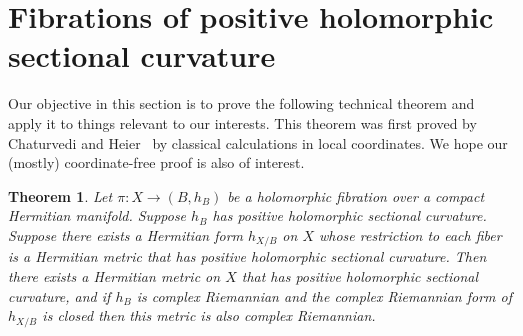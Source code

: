 \documentclass[10pt,a4paper]{amsart}
\newtheorem{theo}{Theorem}[section]
\theoremstyle{definition}
\def\kahler{complex Riemannian}
\begin{document}
\section{Fibrations of positive holomorphic sectional curvature}
\label{sec:grassmannian-bundles}

Our objective in this section is to prove the following technical theorem and apply it to things relevant to our interests.
This theorem was first proved by Chaturvedi and Heier~\cite[Theorem~1.1]{chaturvedi2020hermitian} by classical calculations in local coordinates.
We hope our (mostly) coordinate-free proof is also of interest.

\begin{theo}
\label{thm:holomorphic-sectional-positive}
Let $\pi : X \to (B,h_{B})$ be a holomorphic fibration over a compact Hermitian manifold.
Suppose $h_{B}$ has positive holomorphic sectional curvature.
Suppose there exists a Hermitian form $h_{X/B}$ on $X$ whose restriction to each fiber is a Hermitian metric that has positive holomorphic sectional curvature.
Then there exists a Hermitian metric on $X$ that has positive holomorphic sectional curvature, and if $h_{B}$ is \kahler{} and the \kahler{} form of $h_{X/B}$ is closed then this metric is also \kahler{}.
\end{theo}
\end{document}
